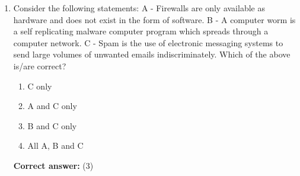 \documentclass[12pt]{article}
\begin{document}
\begin{enumerate}[label=Q\arabic*:,leftmargin=*,resume]
\item Consider the following statements: A - Firewalls are only available as hardware and does not exist in the form of software. B - A computer worm is a self replicating malware computer program which spreads through a computer network. C - Spam is the use of electronic messaging systems to send large volumes of unwanted emails indiscriminately. Which of the above is/are correct?\\
\begin{enumerate}[label=(\arabic*)]
\item C only
\item A and C only
\item B and C only
\item All A, B and C
\end{enumerate}
\textbf{Correct answer:} (3)
\end{enumerate}

\end{document}
